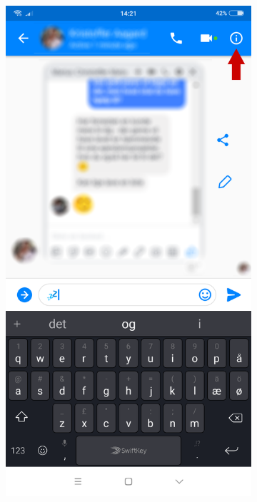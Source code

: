 \begin{figure}[H]
\begin{subfigure}{0.33\textwidth}
        \caption{}
        \label{fig:}
    \end{subfigure}
    \begin{subfigure}{0.33\textwidth}
        \centering
        \includegraphics[scale=0.15]{Projectdoc/Problemanalyse/Illustrationer/2-fbchat.png}

\end{subfigure}
\end{figure}
